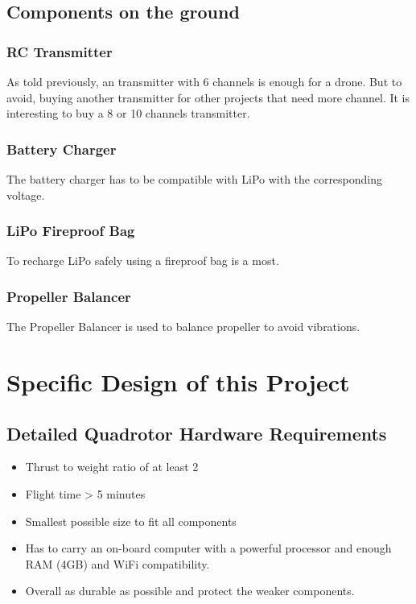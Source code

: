 \subsection{Components on the ground}

\subsubsection{RC Transmitter}
As told previously, an transmitter with 6 channels is enough for a drone. But to avoid, buying another transmitter for other projects that need more channel. It is interesting to buy a 8 or 10 channels transmitter.

\subsubsection{Battery Charger}
The battery charger has to be compatible with LiPo with the corresponding voltage.

\subsubsection{LiPo Fireproof Bag}
To recharge LiPo safely using a fireproof bag is a most.

\subsubsection{Propeller Balancer}
The Propeller Balancer is used to balance propeller to avoid vibrations.


\section{Specific Design of this Project}

\subsection{Detailed Quadrotor Hardware Requirements}
\begin{itemize}
    \item Thrust to weight ratio of at least 2
    \item Flight time > 5 minutes
    \item Smallest possible size to fit all components
    \item Has to carry an on-board computer with a powerful processor and enough RAM (4GB) and WiFi compatibility.
    \item Overall as durable as possible and protect the weaker components.
\end{itemize}

